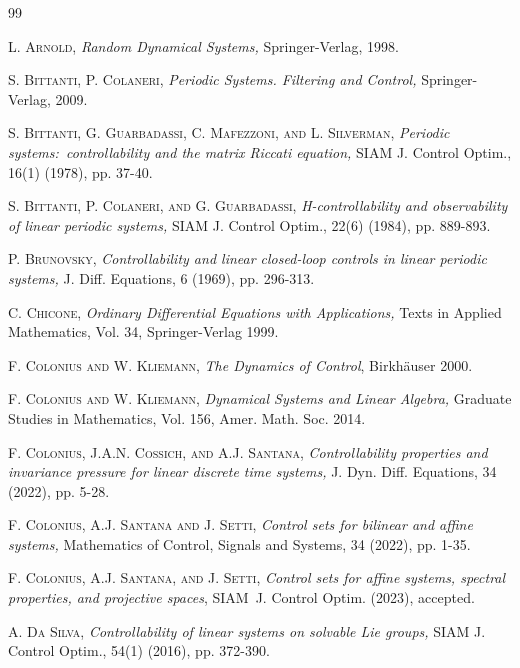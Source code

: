 \documentclass{siamltex}%
\begin{document}
\begin{thebibliography}{99}                                                                                               %


\textsc{L. Arnold,}\emph{ Random Dynamical Systems,}
Springer-Verlag, 1998.

\textsc{S. Bittanti, P. Colaneri, }\emph{Periodic Systems.
Filtering and Control, }Springer-Verlag, 2009.

\textsc{S. Bittanti, G. Guarbadassi, C. Mafezzoni, and L.
Silverman,} \emph{Periodic systems:\ controllability and the matrix Riccati
equation,} SIAM J. Control Optim., 16(1) (1978), pp. 37-40.

\textsc{S. Bittanti, P. Colaneri, and G. Guarbadassi,}
\emph{H-controllability and observability of linear periodic systems,} SIAM J.
Control Optim., 22(6) (1984), pp. 889-893.

\textsc{P. Brunovsky,} \emph{Controllability and linear
closed-loop controls in linear periodic systems,} J. Diff. Equations, 6
(1969), pp. 296-313.

\textsc{C. Chicone,} \emph{Ordinary Differential Equations
with Applications,} Texts in Applied Mathematics, Vol. 34, Springer-Verlag 1999.

\textsc{F. Colonius and W. Kliemann,}\emph{ The Dynamics of
Control}, Birkh\"{a}user 2000.

\textsc{F. Colonius and W. Kliemann,}\emph{ Dynamical Systems
and Linear Algebra, }Graduate Studies in Mathematics, Vol. 156, Amer. Math.
Soc. 2014.

\textsc{F. Colonius, J.A.N. Cossich, and A.J. Santana,}
\emph{Controllability properties and invariance pressure for linear discrete
time systems,} J. Dyn. Diff. Equations, 34 (2022), pp. 5-28.

\textsc{F. Colonius, A.J. Santana and J. Setti,} \emph{Control
sets for bilinear and affine systems,} Mathematics of Control, Signals and
Systems, 34 (2022), pp. 1-35.

\textsc{F. Colonius, A.J. Santana, and J. Setti,}
\emph{Control sets for affine systems, spectral properties, and projective
spaces}, SIAM\ J. Control Optim. (2023), accepted.

\textsc{A. Da Silva,} \emph{Controllability of linear systems
on solvable Lie groups,} SIAM J. Control Optim., 54(1) (2016), pp. 372-390.


\end{thebibliography}
\end{document}

